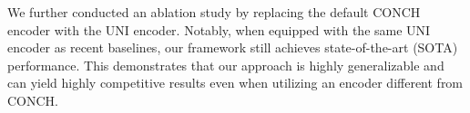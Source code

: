 \documentclass[runningheads]{llncs}
\begin{document}

We further conducted an ablation study by replacing the default CONCH encoder\citep{Lu2024VisualLanguage} with the UNI encoder\citep{Chen2024Towards}. Notably, when equipped with the same UNI encoder as recent baselines, our framework still achieves state-of-the-art (SOTA) performance. This demonstrates that our approach is highly generalizable and can yield highly competitive results even when utilizing an encoder different from CONCH.
\end{document}
